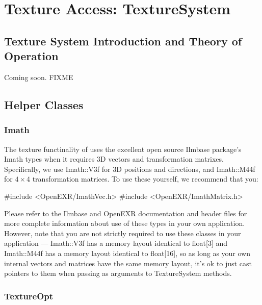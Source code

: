 \chapter{Texture Access: {\cf TextureSystem}}
\label{chap:texturesystem}

\def\TextureSystem{{\kw TextureSystem}\xspace}
\def\TextureOptions{{\kw TextureOptions}\xspace}
\def\TextureOptBatch{{\kw TextureOptBatch}\xspace}
\def\TextureOpt{{\kw TextureOpt}\xspace}


\section{Texture System Introduction and Theory of Operation}
\label{sec:texturesys:intro}

Coming soon.
FIXME

\section{Helper Classes}
\label{sec:texturesys:helperclasses}

\subsection{Imath}

The texture functinality of \product uses the excellent open source
{\cf Ilmbase} package's {\cf Imath} types when it requires 3D vectors
and transformation matrixes.  Specifically, we use {\cf Imath::V3f}
for 3D positions and directions, and {\cf Imath::M44f} for $4 \times 4$
transformation matrices.  To use these yourself, we recommend that you:

\begin{code}
    #include <OpenEXR/ImathVec.h>
    #include <OpenEXR/ImathMatrix.h>
\end{code}

Please refer to the {\cf Ilmbase} and {\cf OpenEXR}
documentation and header files for more complete information about
use of these types in your own application.  However, note that you
are not strictly required to use these classes in your application ---
{\cf Imath::V3f} has a memory layout identical to {\cf float[3]}
and {\cf Imath::M44f} has a memory layout identical to {\cf float[16]},
so as long as your own internal vectors and matrices have the same
memory layout, it's ok to just cast pointers to them when passing
as arguments to \TextureSystem methods.


\subsection{\TextureOpt}
\label{sec:textureopt}

